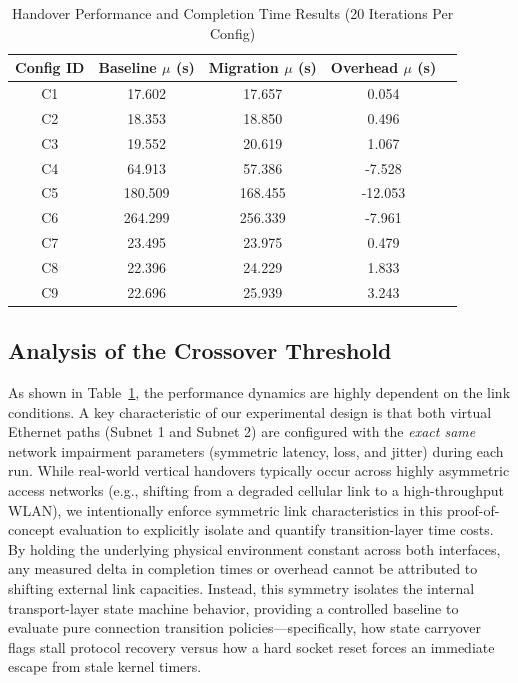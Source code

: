 \documentclass[conference]{IEEEtran}
\begin{document}
\begin{table}[t]
\caption{Handover Performance and Completion Time Results (20 Iterations Per Config)}
\centering
\begin{tabular}{ccccc}
\toprule
\textbf{Config ID} & \textbf{Baseline $\mu$ (s)} & \textbf{Migration $\mu$ (s)} & \textbf{Overhead $\mu$ (s)}  \\
\midrule
C1 & 17.602 & 17.657 & 0.054  \\
C2 & 18.353 & 18.850 & 0.496  \\
C3 & 19.552 & 20.619 & 1.067  \\
C4 & 64.913 & 57.386 & -7.528  \\
C5 & 180.509 & 168.455 & -12.053\\
C6 & 264.299 & 256.339 & -7.961  \\
C7 & 23.495 & 23.975 & 0.479  \\
C8 & 22.396 & 24.229 & 1.833  \\
C9 & 22.696 & 25.939 & 3.243  \\
\bottomrule
\end{tabular}
\label{tab:results}
\end{table}


\subsection{Analysis of the Crossover Threshold}
As shown in Table~\ref{tab:results}, the performance dynamics are highly dependent on the link conditions. A key characteristic of our experimental design is that both virtual Ethernet paths (Subnet 1 and Subnet 2) are configured with the \textit{exact same} network impairment parameters (symmetric latency, loss, and jitter) during each run. While real-world vertical handovers typically occur across highly asymmetric access networks (e.g., shifting from a degraded cellular link to a high-throughput WLAN), we intentionally enforce symmetric link characteristics in this proof-of-concept evaluation to explicitly isolate and quantify transition-layer time costs. 
By holding the underlying physical environment  constant across both interfaces, any measured delta in completion times or overhead cannot be attributed to shifting external link capacities. Instead, this symmetry isolates the internal transport-layer state machine behavior, providing a controlled baseline to evaluate pure connection transition policies—specifically, how state carryover flags stall protocol recovery versus how a hard socket reset forces an immediate escape from stale kernel timers.
\end{document}

